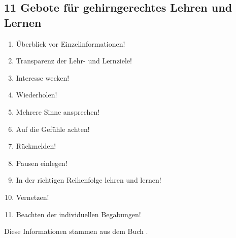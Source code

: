 \subsection{11 Gebote für gehirngerechtes Lehren und Lernen}
\begin{enumerate}
  \item Überblick vor Einzelinformationen!
  \item Transparenz der Lehr- und Lernziele!
  \item Interesse wecken!
  \item Wiederholen!
  \item Mehrere Sinne ansprechen!
  \item Auf die Gefühle achten!
  \item Rückmelden!
  \item Pausen einlegen!
  \item In der richtigen Reihenfolge lehren und lernen!
  \item Vernetzen!
  \item Beachten der individuellen Begabungen!
\end{enumerate}

Diese Informationen stammen aus dem Buch \cite{kopf}.
